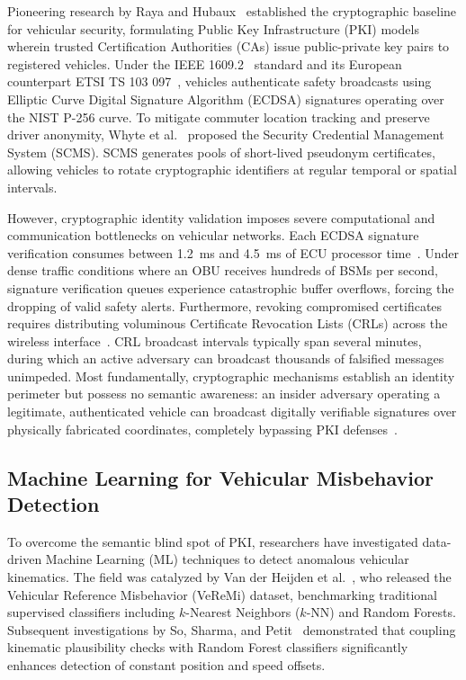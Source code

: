 \documentclass[conference]{IEEEtran}
\begin{document}
Pioneering research by Raya and Hubaux~\cite{raya} established the cryptographic baseline for vehicular security, formulating Public Key Infrastructure (PKI) models wherein trusted Certification Authorities (CAs) issue public-private key pairs to registered vehicles. Under the IEEE 1609.2~\cite{ieee16092} standard and its European counterpart ETSI TS 103 097~\cite{etsi103097}, vehicles authenticate safety broadcasts using Elliptic Curve Digital Signature Algorithm (ECDSA) signatures operating over the NIST P-256 curve. To mitigate commuter location tracking and preserve driver anonymity, Whyte et al.~\cite{whyte2013security} proposed the Security Credential Management System (SCMS). SCMS generates pools of short-lived pseudonym certificates, allowing vehicles to rotate cryptographic identifiers at regular temporal or spatial intervals. 

However, cryptographic identity validation imposes severe computational and communication bottlenecks on vehicular networks. Each ECDSA signature verification consumes between 1.2~ms and 4.5~ms of ECU processor time~\cite{kargl2008secure}. Under dense traffic conditions where an OBU receives hundreds of BSMs per second, signature verification queues experience catastrophic buffer overflows, forcing the dropping of valid safety alerts. Furthermore, revoking compromised certificates requires distributing voluminous Certificate Revocation Lists (CRLs) across the wireless interface~\cite{whyte2013security}. CRL broadcast intervals typically span several minutes, during which an active adversary can broadcast thousands of falsified messages unimpeded. Most fundamentally, cryptographic mechanisms establish an identity perimeter but possess no semantic awareness: an insider adversary operating a legitimate, authenticated vehicle can broadcast digitally verifiable signatures over physically fabricated coordinates, completely bypassing PKI defenses~\cite{veremi}.

\subsection{Machine Learning for Vehicular Misbehavior Detection}

To overcome the semantic blind spot of PKI, researchers have investigated data-driven Machine Learning (ML) techniques to detect anomalous vehicular kinematics. The field was catalyzed by Van der Heijden et al.~\cite{veremi}, who released the Vehicular Reference Misbehavior (VeReMi) dataset, benchmarking traditional supervised classifiers including $k$-Nearest Neighbors ($k$-NN) and Random Forests. Subsequent investigations by So, Sharma, and Petit~\cite{so2018verifying} demonstrated that coupling kinematic plausibility checks with Random Forest classifiers significantly enhances detection of constant position and speed offsets.
\end{document}
